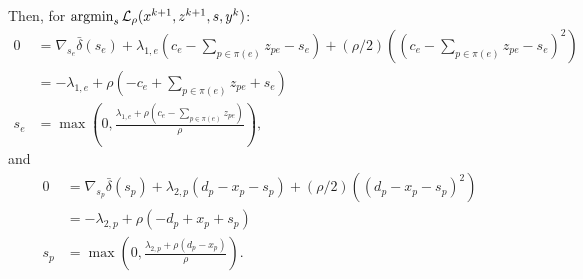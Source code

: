 \documentclass[11pt]{article}
\begin{document}
Then, for $\operatorname*{argmin}_{s} \mathcal{L}_\rho(x^{k+1},z^{k+1},s,y^k)$:
\begin{align*}
0
&= \nabla_{s_{e}}\bar\delta(s_{e}) + \lambda_{1,e}(c_e - \sum_{p\in\pi(e)} z_{pe} - s_{e})
    + (\rho/2)((c_e - \sum_{p\in\pi(e)} z_{pe} - s_{e})^2)\\
&= -\lambda_{1,e} + \rho(-c_e + \sum_{p\in\pi(e)} z_{pe} + s_e)\\
s_{e} &= \max(0,\frac{\lambda_{1,e} + \rho(c_e - \sum_{p\in\pi(e)}z_{pe})}{\rho}),
\end{align*}
and
\begin{align*}
0
&= \nabla_{s_{p}}\bar\delta(s_{p}) + \lambda_{2,p}(d_p - x_p - s_p)
    + (\rho/2)((d_p - x_p - s_{p})^2)\\
&= -\lambda_{2,p} + \rho(-d_p + x_p + s_p)\\
s_{p} &= \max(0,\frac{\lambda_{2,p} + \rho(d_p - x_p)}{\rho}).
\end{align*}
\end{document}
